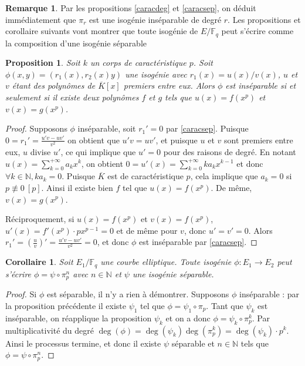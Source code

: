 \documentclass{article}
\theoremstyle{plain}%
\newtheorem{prop}[thm]{Proposition}
\newtheorem{cor}[thm]{Corollaire}
\theoremstyle{definition}%
\newtheorem{rem}[thm]{Remarque}
\newcommand{\F}{\mathbb{F}}
\newcommand{\N}{\mathbb{N}}
\begin{document}
\begin{rem}
  \label{degpi}
  Par les propositions \ref{caracdeg} et \ref{caracsep}, on déduit immédiatement que $\pi_r$ est une isogénie inséparable de degré $r$. Les propositions et corollaire suivants vont montrer que toute isogénie de $E/\F_q$ peut s'écrire comme la composition d'une isogénie séparable 
\end{rem}



\begin{prop}
  Soit $k$ un corps de caractéristique $p$. Soit $\phi(x, y) = (r_1(x), r_2(x)y)$ une isogénie avec $r_1(x) = u(x)/v(x)$, $u$ et $v$ étant des polynômes de $\overline{K}[x]$ premiers entre eux. Alors $\phi$ est inséparable si et seulement si il existe deux polynômes $f$ et $g$ tels que $u(x) = f(x^p)$ et $v(x) = g(x^p)$.
\end{prop}


\begin{proof}
  Supposons $\phi$ inséparable, soit $r_1' = 0$ par \ref{caracsep}. Puisque $0 = r_1' = \frac{u'v -uv'}{v^2}$ on obtient que $u'v = uv'$, et puisque $u$ et $v$ sont premiers entre eux, $u$ divise $u'$, ce qui implique que $u' = 0$ pour des raisons de degré.  En notant $u(x) = \sum_{k=0}^{+\infty} a_kx^k$, on obtient $0 = u'(x) = \sum_{k=0}^{+\infty} ka_kx^{k-1}$ et donc $\forall k\in \N, ka_k = 0$. Puisque $\overline{K}$ est de caractéristique $p$, cela implique que $a_k = 0$ si $p\not\equiv 0\ [p]$. Ainsi il existe bien $f$ tel que $u(x) = f(x^p)$. De même, $v(x) = g(x^p)$. 

  Réciproquement, si $u(x) = f(x^p)$ et $v(x) = f(x^p)$, $u'(x) = f'(x^p)\cdot px^{p-1} = 0$ et de même pour $v$, donc $u' = v' = 0$. Alors $r_1' = (\frac{u}{v})' =  \frac{u'v -uv'}{v^2} = 0$, et donc $\phi$ est inséparable par \ref{caracsep}.
\end{proof}



\begin{cor}
  Soit $E_1/\F_q$ une courbe elliptique. Toute isogénie $\phi : E_1 \to E_2 $ peut s'écrire $\phi = \psi \circ \pi_p^n$ avec $n\in \N$ et $\psi$ une isogénie séparable.
\end{cor}

\begin{proof}
  Si $\phi$ est séparable, il n'y a rien à démontrer. Supposons $\phi$ inséparable : par la proposition précédente il existe $\psi_1$ tel que $\phi = \psi_1 \circ \pi_p$. Tant que $\psi_k$ est inséparable, on réapplique la proposition $\psi_k$ et on a donc $\phi = \psi_k \circ \pi_p^k$. 
  Par multiplicativité du degré $\deg(\phi) = \deg(\psi_k)\deg(\pi_p^k) = \deg(\psi_k)\cdot p^k$.
  Ainsi le processus termine, et donc il existe $\psi$ séparable et $n\in \N$ tels que $\phi = \psi \circ \pi_p^n$.
\end{proof}
\end{document}

